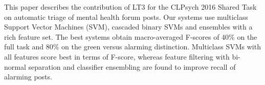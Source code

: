 This paper describes the contribution of LT3 for the CLPsych 2016 Shared Task on automatic triage of mental health forum posts. Our systems use multiclass Support Vector Machines (SVM), cascaded binary SVMs and ensembles with a rich feature set. The best systems obtain macro-averaged F-scores of 40\% on the full task and 80\% on the green versus alarming distinction. Multiclass SVMs with all features score best in terms of F-score, whereas feature filtering with bi-normal separation and classifier ensembling are found to improve recall of alarming posts.
